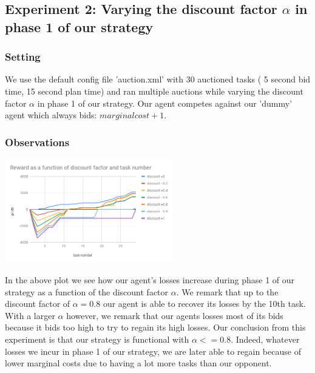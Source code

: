 \documentclass[11pt]{article}
\begin{document}
  \subsection{Experiment 2: Varying the discount factor $\alpha$ in phase 1 of our strategy}

  \subsubsection{Setting}
  We use the default config file 'auction.xml' with 30 auctioned tasks ( 5 second bid time, 15 second plan time) and ran multiple auctions while varying the discount factor $\alpha$ in phase 1 of our strategy. Our agent competes against our 'dummy' agent which always bids: $marginal cost + 1$.

  \subsubsection{Observations}

  \includegraphics[width=0.55\textwidth]{discount.png}

  In the above plot we see how our agent's losses increase during phase 1 of our strategy as a function of the  discount factor $\alpha$. We remark that up to the discount factor of $\alpha = 0.8$ our agent is able to recover its losses by the 10th task. With a larger $\alpha$ however, we remark that our agents losses most of its bids because it bids too high to try to regain its high losses. Our conclusion from this experiment is that our strategy is functional with  $\alpha <= 0.8$. Indeed, whatever losses we incur in phase 1 of our strategy, we are later able to regain because of lower marginal costs due to having a lot more tasks than our opponent.
\end{document}
